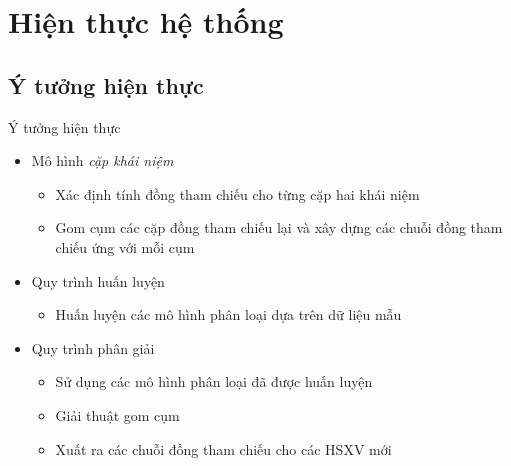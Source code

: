 \section{Hiện thực hệ thống}
%
%

\subsection{Ý tưởng hiện thực}
\begin{frame}{Ý tưởng hiện thực}
\putlogo
\begin{itemize}
	\item Mô hình \emph{cặp khái niệm}
	\begin{itemize}
		\item Xác định tính đồng tham chiếu cho từng cặp hai khái niệm
		\item Gom cụm các cặp đồng tham chiếu lại và xây dựng các chuỗi đồng tham chiếu ứng với mỗi cụm
	\end{itemize}
	\item Quy trình huấn luyện
	\begin{itemize}
		\item Huấn luyện các mô hình phân loại dựa trên dữ liệu mẫu 
	\end{itemize}
	\item Quy trình phân giải
	\begin{itemize}
		\item Sử dụng các mô hình phân loại đã được huấn luyện
		\item Giải thuật gom cụm
		\item Xuất ra các chuỗi đồng tham chiếu cho các HSXV mới
	\end{itemize}
\end{itemize}
\end{frame}


